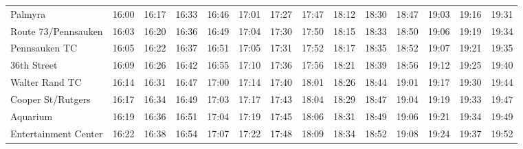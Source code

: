 \begin{center}
\begin{tabular}{@{}lrrrrrrrrrrrrr@{}}
Palmyra & 16:00 & 16:17 & 16:33 & 16:46 & 17:01 & 17:27 & 17:47 & 18:12 & 18:30 & 18:47 & 19:03 & 19:16 & 19:31 \\
Route 73/Pennsauken & 16:03 & 16:20 & 16:36 & 16:49 & 17:04 & 17:30 & 17:50 & 18:15 & 18:33 & 18:50 & 19:06 & 19:19 & 19:34 \\
Pennsauken TC & 16:05 & 16:22 & 16:37 & 16:51 & 17:05 & 17:31 & 17:52 & 18:17 & 18:35 & 18:52 & 19:07 & 19:21 & 19:35 \\
36th Street & 16:09 & 16:26 & 16:42 & 16:55 & 17:10 & 17:36 & 17:56 & 18:21 & 18:39 & 18:56 & 19:12 & 19:25 & 19:40 \\
Walter Rand TC & 16:14 & 16:31 & 16:47 & 17:00 & 17:14 & 17:40 & 18:01 & 18:26 & 18:44 & 19:01 & 19:17 & 19:30 & 19:44 \\
Cooper St/Rutgers & 16:17 & 16:34 & 16:49 & 17:03 & 17:17 & 17:43 & 18:04 & 18:29 & 18:47 & 19:04 & 19:19 & 19:33 & 19:47 \\
Aquarium & 16:19 & 16:36 & 16:51 & 17:04 & 17:19 & 17:45 & 18:06 & 18:31 & 18:49 & 19:06 & 19:21 & 19:34 & 19:49 \\
Entertainment Center & 16:22 & 16:38 & 16:54 & 17:07 & 17:22 & 17:48 & 18:09 & 18:34 & 18:52 & 19:08 & 19:24 & 19:37 & 19:52 \\
\bottomrule\end{tabular}\end{center}
